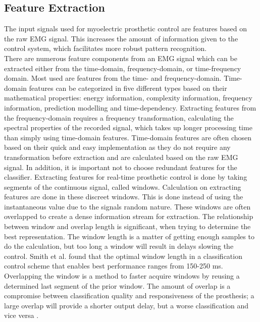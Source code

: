 \subsection{Feature Extraction} \label{sub:BG:featureExtraction} %
The input signals used for myoelectric prosthetic control are features based on the raw EMG signal. This increases the amount of information given to the control system, which facilitates more robust pattern recognition. \\
There are numerous feature components from an EMG signal which can be extracted either from the time-domain, frequency-domain, or time-frequency domain. Most used are features from the time- and frequency-domain. Time-domain features can be categorized in five different types based on their mathematical properties: energy information, complexity information, frequency information, prediction modelling and time-dependency. Extracting features from the frequency-domain requires a frequency transformation, calculating the spectral properties of the recorded signal, which takes up longer processing time than simply using time-domain features. 
Time-domain features are often chosen based on their quick and easy implementation as they do not require any transformation before extraction and are calculated based on the raw EMG signal. In addition, it is important not to choose redundant features for the classifier. \cite{Phiny2012}%
Extracting features for real-time prosthetic control is done by taking segments of the continuous signal, called windows. Calculation on extracting features are done in these discreet windows. This is done instead of using the instantaneous value due to the signals random nature. These windows are often overlapped to create a dense information stream for extraction. The relationship between window and overlap length is significant, when trying to determine the best representation. The window length is a matter of getting enough samples to do the calculation, but too long a window will result in delays slowing the control. Smith et al. \cite{Smith2014} found that the optimal window length in a classification control scheme that enables best performance ranges from 150-250 ms. Overlapping the window is a method to faster acquire windows by reusing a determined last segment of the prior window. The amount of overlap is a compromise between classification quality and responsiveness of the prosthesis; a large overlap will provide a shorter output delay, but a worse classification and vice versa \cite{Farrell2007}.
